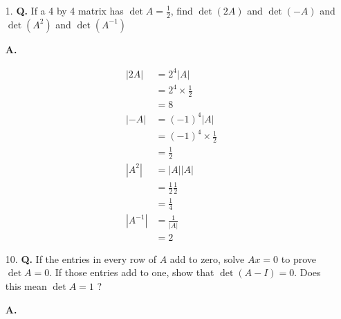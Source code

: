 \documentclass[main.tex]{subfiles}
\begin{document}
\begin{enumerate}
    \item [1.] \textbf{Q.} If a 4 by 4 matrix has $\operatorname{det} A=\frac{1}{2}$, find $\operatorname{det}(2 A)$ and $\operatorname{det}(-A)$ and $\operatorname{det}\left(A^{2}\right)$ and $\operatorname{det}\left(A^{-1}\right)$ 
    
    \textbf{A.}
    
    $$
    \begin{aligned}
    |2 A| &=2^{4}|A| \\
    &=2^{4} \times \frac{1}{2} \\
    &=8 \\
    |-A| &= (-1)^{4}|A| \\
    & = (-1)^{4} \times \frac{1}{2} \\
    & = \frac{1}{2} \\
    \left|A^{2}\right| &= |A||A| \\
    &= \frac{1}{2} \frac{1}{2} \\
    &= \frac{1}{4}\\
    \left|A^{-1}\right| &=\frac{1}{|A|} \\
    &=2
    \end{aligned}
    $$
    
    \item [10.] \textbf{Q.} If the entries in every row of $A$ add to zero, solve $A x=0$ to prove $\operatorname{det} A=0$. If those entries add to one, show that $\operatorname{det}(A-I)=0$. Does this mean $\operatorname{det} A=1$ ? 
    
    \textbf{A.}
    

\end{enumerate}
\end{document}
